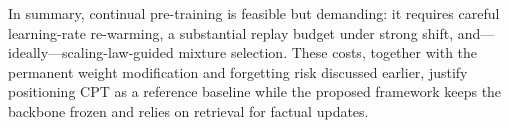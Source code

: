 In summary, continual pre-training is feasible but demanding: it requires careful learning-rate re-warming, a substantial replay budget under strong shift, and---ideally---scaling-law-guided mixture selection. These costs, together with the permanent weight modification and forgetting risk discussed earlier, justify positioning CPT as a reference baseline while the proposed framework keeps the backbone frozen and relies on retrieval for factual updates.
